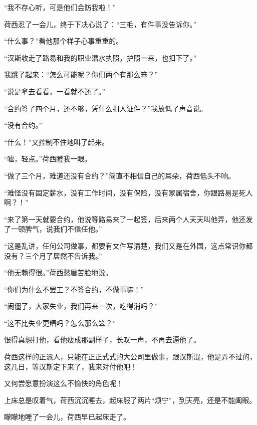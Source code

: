 \par “我不存心听，可是他们会防我啦！”
\par 荷西忍了一会儿，终于下决心说了：“三毛，有件事没告诉你。”
\par “什么事？”看他那个样子心事重重的。
\par “汉斯收走了路易和我的职业潜水执照，护照一来，也扣下了。”
\par 我跳了起来：“怎么可能呢？你们两个有那么笨？”
\par “说是拿去看看，一看就不还了。”
\par “合约签了四个月，还不够，凭什么扣人证件？”我放低了声音说。
\par “没有合约。”
\par “什么！”又控制不住地叫了起来。
\par “嘘，轻点。”荷西瞪我一眼。
\par “做了三个月，难道还没有合约？”简直不相信自己的耳朵，荷西低头不响。
\par “难怪没有固定薪水，没有工作时间，没有保险，没有家属宿舍，你跟路易是死人啊？！”
\par “来了第一天就要合约，他说等路易来了一起签，后来两个人天天叫他弄，他还发了一顿脾气，说我们不信任他。”
\par “这是乱讲，任何公司做事，都要有文件写清楚，我们又是在外国，这点常识你都没有？三个月了居然不告诉我。”
\par “他无赖得很。”荷西愁眉苦脸地说。
\par “你们为什么不罢工？不签合约，不做事嘛！”
\par “闹僵了，大家失业，我们再来一次，吃得消吗？”
\par “这不比失业更糟吗？怎么那么笨？”
\par 恨得真想打他，看他瘦成那副样子，长叹一声，不再去逼他了。
\par 荷西这样的正派人，只能在正正式式的大公司里做事，跟汉斯混，他是弄不过的，这几日，等汉斯定下来了，我来对付他吧！
\par 又何尝愿意扮演这么不愉快的角色呢！
\par 上床总是叹着气，荷西沉沉睡去，起床服了两片“烦宁”，到天亮，还是不能阖眼。
\par 矇矇地睡了一会儿，荷西早已起床走了。



